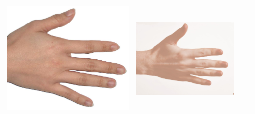 \begin{longtable}{|N||c|c|c|}
\begin{minipage}{.29\textwidth}
    \includegraphics[width=\textwidth,height=\textheight,keepaspectratio]{../inputs/hand_light.jpg}
  \end{minipage} & 
  \begin{minipage}{.29\textwidth}
    \includegraphics[width=\textwidth,height=\textheight,keepaspectratio]{../rc_test/outputs/20170517_proportional_corrected_test_alpha10/hand_pale_to_hand_light.jpg}
  \end{minipage} \\
\hline
 \end{longtable}